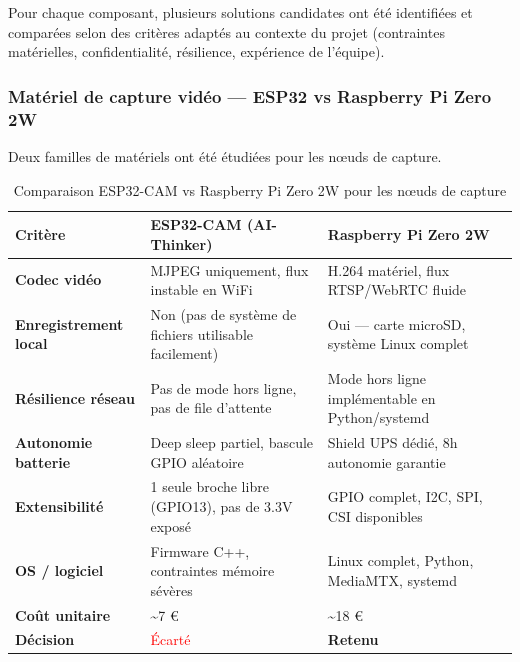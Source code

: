 \documentclass[12pt,a4paper]{article}
\begin{document}
Pour chaque composant, plusieurs solutions candidates ont été identifiées et comparées selon des critères adaptés au contexte du projet (contraintes matérielles, confidentialité, résilience, expérience de l'équipe).

\subsubsection{Matériel de capture vidéo --- ESP32 vs Raspberry Pi Zero 2W}

Deux familles de matériels ont été étudiées pour les nœuds de capture.

\begin{table}[H]
\centering
\small
\renewcommand{\arraystretch}{1.3}
\begin{tabular}{|l|p{4.5cm}|p{4.5cm}|}
\hline
\textbf{Critère} & \textbf{ESP32-CAM (AI-Thinker)} & \textbf{Raspberry Pi Zero 2W} \\
\hline
\textbf{Codec vidéo} & MJPEG uniquement, flux instable en WiFi & H.264 matériel, flux RTSP/WebRTC fluide \\
\hline
\textbf{Enregistrement local} & Non (pas de système de fichiers utilisable facilement) & Oui --- carte microSD, système Linux complet \\
\hline
\textbf{Résilience réseau} & Pas de mode hors ligne, pas de file d'attente & Mode hors ligne implémentable en Python/systemd \\
\hline
\textbf{Autonomie batterie} & Deep sleep partiel, bascule GPIO aléatoire & Shield UPS dédié, 8h autonomie garantie \\
\hline
\textbf{Extensibilité} & 1 seule broche libre (GPIO13), pas de 3.3V exposé & GPIO complet, I2C, SPI, CSI disponibles \\
\hline
\textbf{OS / logiciel} & Firmware C++, contraintes mémoire sévères & Linux complet, Python, MediaMTX, systemd \\
\hline
\textbf{Coût unitaire} & \textasciitilde 7 € & \textasciitilde 18 € \\
\hline
\textbf{Décision} & \textcolor{red}{Écarté} & \textcolor{green!60!black}{\textbf{Retenu}} \\
\hline
\end{tabular}
\caption{Comparaison ESP32-CAM vs Raspberry Pi Zero 2W pour les nœuds de capture}
\end{table}
\end{document}
